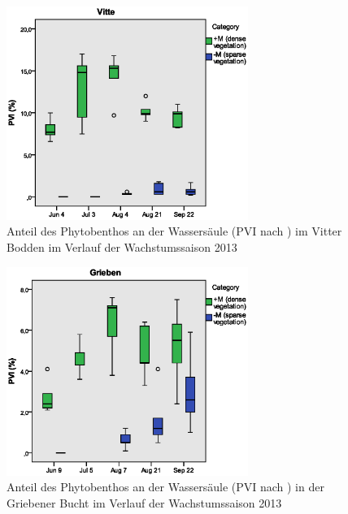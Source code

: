 \begin{figure}[!htb]
\centering
\includegraphics[width=0.70\textwidth]{images/pvi/boxplot_pvi1.eps}
\caption[PVI, Vitte]{Anteil des Phytobenthos an der Wassersäule (PVI nach \cite{jeppesen_1998}) im Vitter Bodden im Verlauf der Wachstumssaison 2013}
\label{fig:pvi_vitte}
\end{figure}

\begin{figure}[!htb]
\centering
\includegraphics[width=0.70\textwidth]{images/pvi/boxplot_pvi2.eps}
\caption[PVI, Grieben]{Anteil des Phytobenthos an der Wassersäule (PVI nach \cite{jeppesen_1998}) in der Griebener Bucht im Verlauf der Wachstumssaison 2013}
\label{fig:pvi_grieben}
\end{figure}

\FloatBarrier





